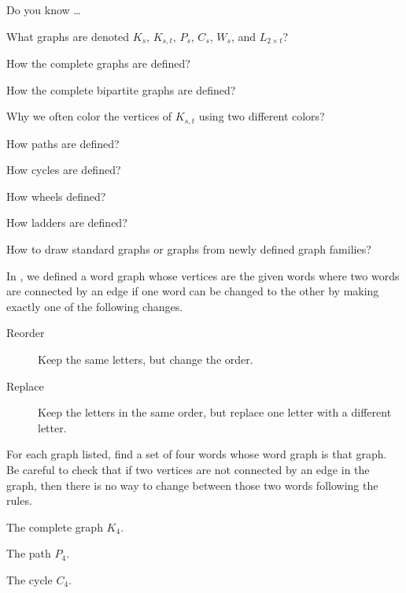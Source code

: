 \begin{exer}[\exerR] %
\label{exer_dyk_std_graphs}
    Do you know \ldots
        \begin{exerpart}
            \item What graphs are denoted $K_s$, $K_{s,t}$, $P_s$, $C_s$, $W_s$, and $L_{2 \times t}$?
            \item How the complete graphs are defined?
            \item How the complete bipartite graphs are defined?
            \item Why we often color the vertices of $K_{s,t}$ using two different colors?
            \item How paths are defined?
            \item How cycles are defined?
            \item How wheels defined?
            \item How ladders are defined?
            \item How to draw standard graphs or graphs from newly defined graph families?
        \end{exerpart}
\end{exer}

\begin{exer}[\exerE] %
\label{exer_word_graphs_building}  
    In  , we defined a word graph whose vertices are the given words where two words are connected by an edge if one word can be changed to the other by making exactly one of the following changes.
        \begin{description}
            \item [\quad Reorder] Keep the same letters, but change the order. 
            \item [\quad Replace] Keep the letters in the same order, but replace one letter with a different letter.
        \end{description}  
    For each graph listed, find a set of four words whose word graph is that graph.  Be careful to check that if two vertices are not connected by an edge in the graph, then there is no way to change between those two words following the rules.
        \begin{exerpart}
            \item The complete graph $K_4$.
            \item The path $P_4$.
            \item The cycle $C_4$.
        \end{exerpart}
\end{exer}

